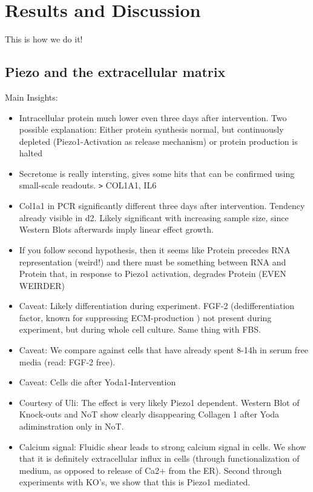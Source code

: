 \chapter{Results and Discussion}

This is how we do it! 
\section{Piezo and the extracellular matrix}

Main Insights:
\begin{itemize}
    \item Intracellular protein much lower even three days after intervention. Two possible explanation: Either protein synthesis normal, but continuously depleted (Piezo1-Activation as release mechanism)  or protein production is halted
    
    \item Secretome is really intersting, gives some hits that can be confirmed using small-scale readouts. \texttt{>} COL1A1, IL6
    
    \item Col1a1 in PCR significantly different three days after intervention. Tendency already visible in d2. Likely significant with increasing sample size, since Western Blots afterwards imply linear effect growth.
    
    \item If you follow second hypothesis, then it seems like Protein precedes RNA representation (weird!) and there must be something between RNA and Protein that, in response to Piezo1 activation, degrades Protein (EVEN WEIRDER)
    
     \item  Caveat: Likely differentiation during experiment. FGF-2 (dedifferentiation factor, known for suppressing ECM-production ) not present during experiment, but during whole cell culture. Same thing with FBS. 
     
    \item Caveat: We compare against cells that have already spent 8-14h in serum free media (read: FGF-2 free).    
    
    \item Caveat: Cells die after Yoda1-Intervention
    
    \item Courtesy of Uli: The effect is very likely Piezo1 dependent. Western Blot of Knock-outs and NoT show clearly disappearing Collagen 1 after Yoda adiminstration only in NoT. 
    
    \item Calcium signal: Fluidic shear leads to strong calcium signal in cells. We show that it is definitely extracellular influx in cells (through functionalization of medium, as opposed to release of Ca2+ from the ER). Second through experiments with KO's, we show that this is Piezo1 mediated. 
\end{itemize}

